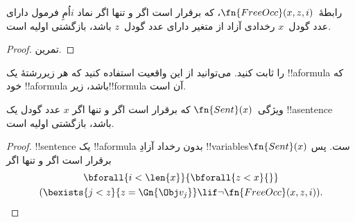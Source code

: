 \documentclass[../../../include/open-logic-section]{subfiles}
\begin{document}
\begin{prop}
رابطهٔ~$\fn{FreeOcc}(x,z,i)$، که برقرار است اگر و تنها اگر نماد
$i$اُمِ فرمول دارای عدد گودل~$x$ رخدادی آزاد از متغیر دارای عدد
گودل~$z$ باشد، بازگشتی اولیه است.
\end{prop}

\begin{proof}
تمرین.
\end{proof}

\begin{prob}
 را ثابت کنید. می‌توانید
از این واقعیت استفاده کنید که هر زیررشتهٔ یک !!a{formula} که خود
!!a{formula} باشد، زیر!!{formula} آن است.
\end{prob}

\begin{prop}
ویژگی~$\fn{Sent}(x)$ که برقرار است اگر و تنها اگر $x$ عدد گودل یک
!!a{sentence} باشد، بازگشتی اولیه است.
\end{prop}

\begin{proof}
!!{sentence} یک !!a{formula} بدون رخداد آزادِ !!{variable}sست. پس
$\fn{Sent}(x)$ برقرار است اگر و تنها اگر
\begin{multline*}
\bforall{i<\len{x}}{\bforall{z<x}{}}\\
(\bexists{j<z}{z=\Gn{\Obj v_j}} \lif \lnot\fn{FreeOcc}(x,z,i)).
\end{multline*}
\end{proof}
\end{document}
